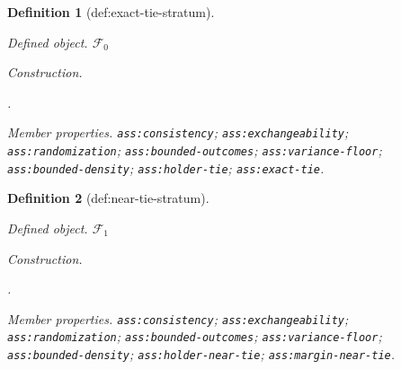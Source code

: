 \documentclass{article}
\newtheorem{definition}{Definition}
\begin{document}
\begin{definition}[def:exact-tie-stratum]\label{def:exact-tie-stratum}
\par\smallskip\noindent\emph{Defined object.} \(\mathcal F_0\)
\par\smallskip\noindent\emph{Construction.} \par\noindent {}\par\noindent.
\par\smallskip\noindent\emph{Member properties.} \texttt{ass:\allowbreak{}consistency}; \texttt{ass:\allowbreak{}exchangeability}; \texttt{ass:\allowbreak{}randomization}; \texttt{ass:\allowbreak{}bounded-\allowbreak{}outcomes}; \texttt{ass:\allowbreak{}variance-\allowbreak{}floor}; \texttt{ass:\allowbreak{}bounded-\allowbreak{}density}; \texttt{ass:\allowbreak{}holder-\allowbreak{}tie}; \texttt{ass:\allowbreak{}exact-\allowbreak{}tie}.
\end{definition}

\begin{definition}[def:near-tie-stratum]\label{def:near-tie-stratum}
\par\smallskip\noindent\emph{Defined object.} \(\mathcal F_1\)
\par\smallskip\noindent\emph{Construction.} \par\noindent {}\par\noindent.
\par\smallskip\noindent\emph{Member properties.} \texttt{ass:\allowbreak{}consistency}; \texttt{ass:\allowbreak{}exchangeability}; \texttt{ass:\allowbreak{}randomization}; \texttt{ass:\allowbreak{}bounded-\allowbreak{}outcomes}; \texttt{ass:\allowbreak{}variance-\allowbreak{}floor}; \texttt{ass:\allowbreak{}bounded-\allowbreak{}density}; \texttt{ass:\allowbreak{}holder-\allowbreak{}near-\allowbreak{}tie}; \texttt{ass:\allowbreak{}margin-\allowbreak{}near-\allowbreak{}tie}.
\end{definition}
\end{document}
